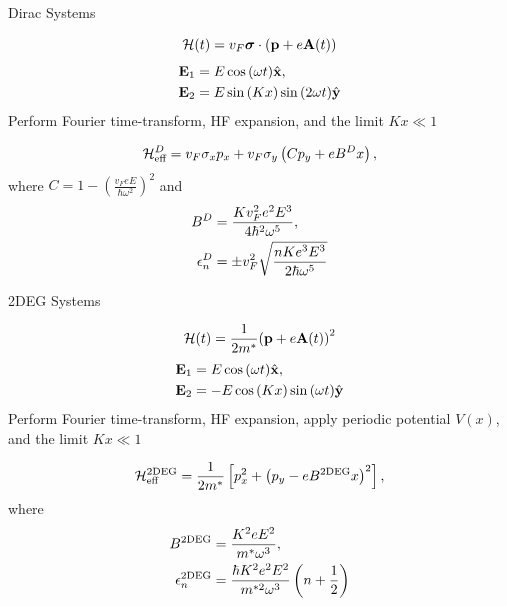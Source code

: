 \documentclass[xcolor=dvipsnames,10pt,aspectratio=169]{beamer}
\let\oldhat\hat
\renewcommand{\hat}[1]{\oldhat{\mathbf{#1}}}
\renewcommand{\vec}[1]{\mathbf{#1}}
\newcommand{\ham}{\mathcal{H}}
\begin{document}
  \begin{frame}{Dirac Systems}

    \begin{equation}
      \small
      \ham (t) = v_F \bm{\sigma} \cdot \left(\vec{p} + e \vec{A}(t)\right)
    \end{equation}
    \begin{align}
      \small
      \vec{E}_1 &= E\cos{(\omega t)} \hat{x}, \nonumber \\
      \vec{E}_2 &= E\sin{(Kx)}\sin{(2\omega t)} \hat{y}
    \end{align}
    Perform Fourier time-transform, HF expansion, and the limit $Kx\ll1$

    \begin{equation}
      \small
      \ham_{\text{eff}}^{D} = v_F \sigma_x p_x + v_F \sigma_y \left( C p_y + eB^Dx \right),
    \end{equation}
    where $C = 1 - {\left(\tfrac{v_F eE}{\hbar \omega^2}\right)}^2$ and
    \begin{align}
      \small
      B^{D} &= \frac{K v_F^2 e^2 E^3}{4\hbar^2 \omega^5}, \\
      \epsilon_n^{D} &= \pm v_F^2 \sqrt{ \dfrac{n K e^3 E^3}{2 \hbar \omega^5} }
    \end{align}


  \end{frame}

  \begin{frame}{2DEG Systems}

    \begin{equation}
      \small
      \ham (t) = \dfrac{1}{2m^*} {\left( \vec{p} +e \vec{A}(t)\right)}^2
    \end{equation}
    \begin{align}
      \small
      \vec{E}_1 &= E\cos{(\omega t)} \hat{x},\nonumber \\
      \vec{E}_2 &= -E\cos{(Kx)}\sin{(\omega t)} \hat{y}
    \end{align}
    Perform Fourier time-transform, HF expansion, apply periodic potential $V(x)$, and the limit $Kx\ll1$

    \begin{equation}
      \small
      \ham_{\text{eff}}^{\text{2DEG}} = \frac{1}{2m^*} \left[ p_x^2 + {\left(p_y - eB^{\text{2DEG}}x \right)}^2\right],
    \end{equation}
    where
    \begin{align}
      \small
      B^{\text{2DEG}} &= \frac{K^2 e E^2}{m^* \omega^3}, \\
      \epsilon_n^{\text{2DEG}} &= \dfrac{\hbar K^2 e^2 E^2}{m^{*2} \omega^3} \left( n+ \dfrac{1}{2}\right)
    \end{align}

  \end{frame}
\end{document}
